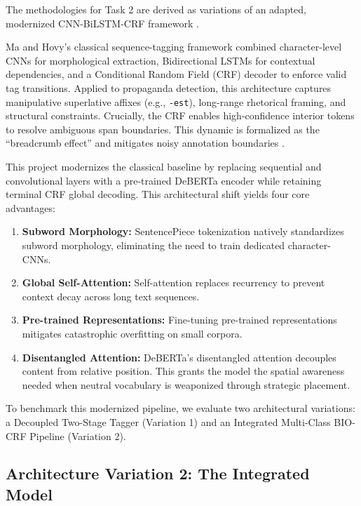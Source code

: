\documentclass[12pt, a4paper]{article}
\begin{document}
The methodologies for Task 2 are derived as variations of an adapted, modernized CNN-BiLSTM-CRF framework \cite{ma2016}.

Ma and Hovy's \cite{ma2016} classical sequence-tagging framework combined character-level CNNs for morphological extraction, Bidirectional LSTMs for contextual dependencies, and a Conditional Random Field (CRF) decoder to enforce valid tag transitions. Applied to propaganda detection, this architecture captures manipulative superlative affixes (e.g., \texttt{-est}), long-range rhetorical framing, and structural constraints. Crucially, the CRF enables high-confidence interior tokens to resolve ambiguous span boundaries. This dynamic is formalized as the ``breadcrumb effect'' and mitigates noisy annotation boundaries \cite{dasan2019}.

This project modernizes the classical baseline by replacing sequential and convolutional layers with a pre-trained DeBERTa encoder while retaining terminal CRF global decoding. This architectural shift yields four core advantages:
\begin{enumerate}[leftmargin=*, noitemsep]
    \item \textbf{Subword Morphology:} SentencePiece tokenization natively standardizes subword morphology, eliminating the need to train dedicated character-CNNs.
    \item \textbf{Global Self-Attention:} Self-attention replaces recurrency to prevent context decay across long text sequences.
    \item \textbf{Pre-trained Representations:} Fine-tuning pre-trained representations mitigates catastrophic overfitting on small corpora.
    \item \textbf{Disentangled Attention:} DeBERTa's disentangled attention decouples content from relative position. This grants the model the spatial awareness needed when neutral vocabulary is weaponized through strategic placement.
\end{enumerate}

To benchmark this modernized pipeline, we evaluate two architectural variations: a Decoupled Two-Stage Tagger (Variation 1) and an Integrated Multi-Class BIO-CRF Pipeline (Variation 2).


\subsection{Architecture Variation 2: The Integrated Model}
\label{subsec:task2_variation2}
\end{document}
